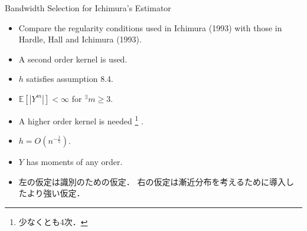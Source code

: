 \documentclass[xcolor=svgnames,dvipdfmx,cjk]{beamer}
\theoremstyle{example}
\def\E{\mathbb{E}}
\begin{document}
\begin{frame}{Bandwidth Selection for Ichimura's Estimator}
  \begin{itemize}
    \item Compare the regularity conditions used in Ichimura (1993) with those in Hardle, Hall and Ichimura (1993).
  \end{itemize}
  \begin{minipage}{0.49\textwidth}  %
    \begin{tcolorbox}[colframe=red!50!white, colback=red!10!white, title=Ichimura (1993)]
        \begin{itemize}
          \item A second order kernel is used.
          \item $h$ satisfies assumption 8.4.
          \item $\E[|Y^m|]<\infty$ for $^\exists m \geq 3$.
        \end{itemize}
    \end{tcolorbox}
  \end{minipage}%
  \hfill
  \begin{minipage}{0.49\textwidth}  %
    \begin{tcolorbox}[colframe=red!50!white, colback=red!10!white, title=HHI (1993)]
        \begin{itemize}
            \item A higher order kernel is needed
                  \footnote{少なくとも4次．}
                  .
            \item $h = O(n^{-\frac{1}{5}})$.
            \item $Y$ has moments of any order.
        \end{itemize}
    \end{tcolorbox}
  \end{minipage} 
  \begin{itemize}
    \item 左の仮定は識別のための仮定．
          右の仮定は漸近分布を考えるために導入したより強い仮定．
  \end{itemize}
\end{frame}
\end{document}
